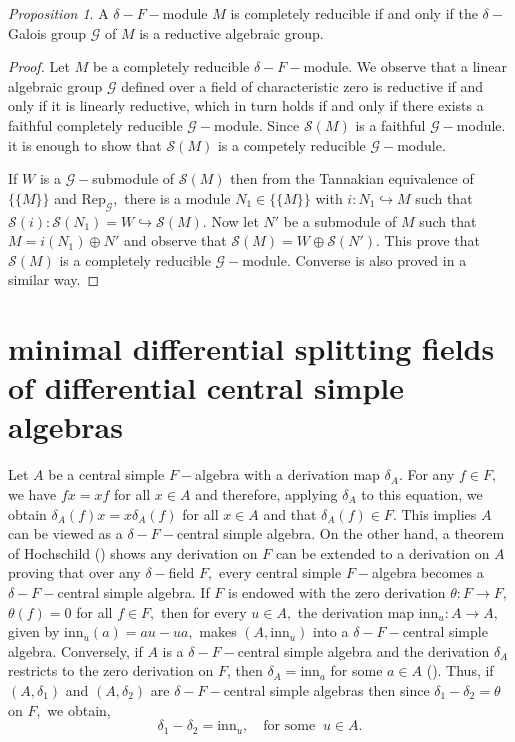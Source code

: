 \documentclass[preprint, 11pt]{amsart}
\theoremstyle{corollary}
\theoremstyle{remark}
\theoremstyle{proposition}
\newtheorem{proposition}[theorem]{Proposition}
\numberwithin{equation}{subsection}
\begin{document}
\begin{proposition}\label{completelyreducible-reductive} A $\delta-F-$module $M$ is completely reducible if and only if the $\delta-$Galois group $\mathscr G$ of $M$ is a reductive algebraic group.\end{proposition}
\begin{proof}   Let $M$ be a completely reducible $\delta-F-$module. We observe that
	a linear algebraic group $\mathscr G$ defined over a field of characteristic zero is  reductive if and only if it is linearly reductive, which in turn holds if and only if there exists a faithful completely reducible $\mathscr G-$module. Since $\mathscr S(M)$ is a faithful $\mathscr G-$module. it is enough to show that  $\mathscr S(M)$ is a competely reducible $\mathscr G-$module.

If   $W$ is a $\mathscr{G}-$submodule of $\mathscr S(M)$ then from the Tannakian equivalence of $\{\{M\}\}$ and $\mathrm{Rep}_{\mathscr{G}},$ there is a module $N_1\in \{\{M\}\}$ with $i: N_1\hookrightarrow M$ such that $\mathscr S(i):\mathscr S(N_1)=W \hookrightarrow\mathscr S(M).$ Now let $N'$ be a submodule of $M$ such that  $M=i(N_1)\oplus N'$ and observe that $\mathscr S(M)=W\oplus \mathscr S(N').$ This prove that $\mathscr S(M)$ is a completely reducible $\mathscr G-$module.   Converse is also proved in a similar way. \end{proof}
	


\section{minimal differential splitting fields of differential central simple algebras}\label{DCSA}
Let $A$ be a central simple $F-$algebra  with a derivation map $\delta_A.$   For any $f\in F,$ we have $fx=xf$ for all $x\in A$ and therefore, applying $\delta_A$ to this equation, we obtain $\delta_A(f)x=x\delta_A(f)$ for all $x\in A$ and that $\delta_A(f)\in F.$ This implies $A$ can be viewed as a  $\delta-F-$central simple algebra.   On the other hand,  a theorem of Hochschild (\cite[Theorem]{Hoc55}) shows any derivation on $F$ can be extended to a derivation on $A$ proving that over any $\delta-$field $F,$ every central simple $F-$algebra becomes a $\delta-F-$central simple algebra.    If $F$ is endowed with the zero derivation $\theta: F\to F,$ $\theta(f)=0$ for all $f\in F,$ then for every $u\in A,$ the derivation map  $\mathrm{inn}_u: A\to A,$ given by $\mathrm{inn}_u(a)=au-ua,$  makes $(A, \mathrm{inn}_u)$ into a $\delta-F-$central simple algebra. Conversely, if $A$ is a $\delta-F-$central simple algebra and the derivation $\delta_A$ restricts to the zero derivation on $F$, then $\delta_A=\mathrm{inn}_a$ for some $a\in A$ (\cite[Theorem 8]{Jac37}). Thus, if $(A, \delta_1)$ and $(A, \delta_2)$ are $\delta-F-$central simple algebras  then since $\delta_1-\delta_2=\theta$ on $F,$ we obtain, $$\delta_1-\delta_2=\mathrm{inn}_u, \quad \text{for some }\ u\in A.$$
\end{document}
